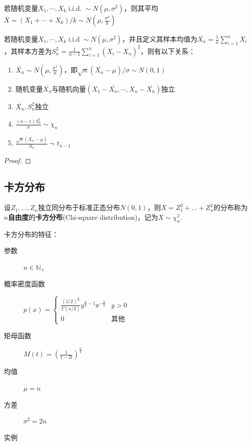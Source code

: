 \begin{corollary}
    若随机变量$X_1,\cdots ,X_k \operatorname{i.i.d.} \sim N(\mu,\sigma^2)$，则其平均$\overline{X}=(X_1+\cdots +X_k)/k \sim N(\mu,\frac{\sigma^2}{k})$
\end{corollary}

\begin{theorem}\label{thm:normal_sample_mean_variance}
    若随机变量$X_1,\cdots ,X_k \operatorname{i.i.d} \sim N(\mu,\sigma^2)$，并且定义其样本均值为$\overline{X_n}=\frac{1}{n}\sum_{i=1}^n X_i$，其样本方差为$S_n^2=\frac{1}{n-1}\sum_{i=1}^n (X_i-\overline{X_n})^2$，则有以下关系：
    \begin{enumerate}
        \item $\overline{X_n} \sim N(\mu,\frac{\sigma^2}{n})$，即$\sqrt{n}(\overline{X_n}-\mu)/\sigma \sim N(0,1)$
        \item 随机变量$\overline{X_n}$与随机向量$(X_1-\overline{X_n},\cdots ,X_n-\overline{X_n})$独立
        \item $\overline{X_n},S_n^2$独立
        \item $\frac{(n-1)S_n^2}{\sigma} \sim \chi_n$
        \item $\frac{\sqrt{n}(\overline{X_n}-\mu)}{S_n} \sim t_{n-1}$
    \end{enumerate}
\end{theorem}
\begin{proof}
\end{proof}

\subsection{卡方分布}

\begin{definition}
    设$Z_1,\dotsc,Z_n$独立同分布于标准正态分布$N(0,1)$，则$X=Z_1^2+\dotsc+Z_n^2$的分布称为\textbf{$n$自由度}的\textbf{卡方分布}(Chi-square distribution)，记为$X \sim \chi^2_n$.
\end{definition}

卡方分布的特征：
\begin{description}
    \item[参数] $n \in \mathbb{N}_+$
    \item[概率密度函数] $p(x)=\begin{cases}
                \frac{(1/2)^{\frac n2}}{\Gamma(n/2)}y^{\frac n2-1}\ee^{-\frac y2} & y>0         \\
                0                                                                 & \text{其他}
            \end{cases}$
    \item[矩母函数] $M(t)=(\frac{1}{1-2t})^{\frac{n}{2}}$
    \item[均值] $\mu=n$
    \item[方差] $\sigma^2=2n$
    \item[实例]
\end{description}

